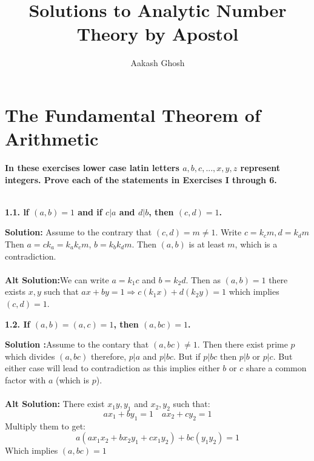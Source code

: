 \documentclass[oneside]{book}
\title{Solutions to Analytic Number Theory by Apostol}
\author{Aakash Ghosh }
\begin{document}
\maketitle
\tableofcontents

\chapter{The Fundamental Theorem of Arithmetic}
\textbf{In these exercises lower case latin letters $a, b, c, ... , x, y, z$ represent integers. 
Prove each of the statements in Exercises I through 6.}\\\\
\begin{tcolorbox}
\textbf{1.1. lf $(a, b)= 1$ and if $c|a$ and $d|b$, then $(c, d)= 1$.}
\end{tcolorbox}
\textbf{Solution:} Assume to the contrary that $(c,d)=m\ne 1$. Write $c=k_cm,d=k_dm$ Then $a=ck_a=k_ak_cm$, $b=k_bk_dm$. Then $(a,b)$ is at least $m$, which is a contradiction.\\\\
\textbf{Alt Solution:}We can write $a=k_1c$ and $b=k_2d$. Then as $(a,b)=1$ there exists $x,y$ such that $ax+by=1\Rightarrow c(k_1x)+d(k_2y)=1$ which implies $(c,d)=1$. 


\begin{tcolorbox}
\textbf{1.2. If $(a, b)= (a, c)= 1$, then $(a, bc)= 1$. }
\end{tcolorbox}
\textbf{Solution :}Assume to the contary that $(a,bc)\ne 1$. Then there exist prime $p$ which divides $(a,bc)$ therefore, $p|a$ and $p|bc$. But if $p|bc$ then $p|b$ or $p|c$. But either case will lead to contradiction as this implies either $b$ or $c$ share a common factor with $a$ (which is $p$).\\\\
\textbf{Alt Solution:} There exist $x_1y,y_1$ and $x_2,y_2$ such that:
$$ax_1+by_1=1\quad ax_2+cy_2=1$$
Multiply them to get:
$$a(ax_1x_2+bx_2y_1+cx_1y_2)+bc(y_1y_2)=1$$
Which implies $(a,bc)=1$
\end{document}
